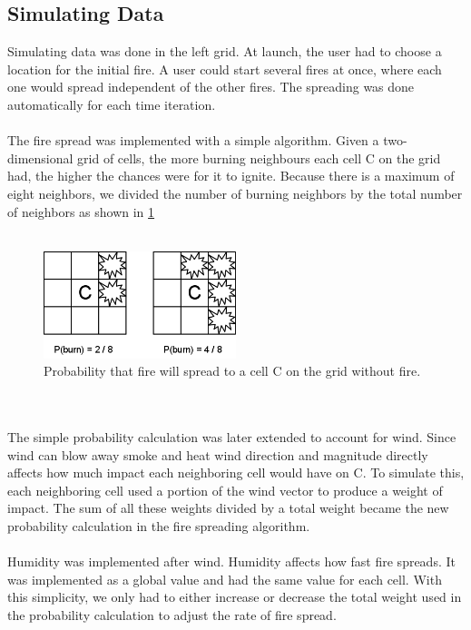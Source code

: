 \subsection{Simulating Data}
Simulating data was done in the left grid. At launch, the user had to choose a location for the initial fire. A user could start several fires at once, where each one would spread independent of the other fires. The spreading was done automatically for each time iteration.
\\\\
The fire spread was implemented with a simple algorithm. Given a two-dimensional grid of cells, the more burning neighbours each cell C on the grid had, the higher the chances were for it to ignite. Because there is a maximum of eight neighbors, we divided the number of burning neighbors by the total number of neighbors as shown in \ref{fig:fire-probability}
\\\\
\begin{figure}[here]
\centering
\includegraphics[width=0.5\textwidth]{solution/graphics/fire-probability.png}
\caption{Probability that fire will spread to a cell C on the grid without fire.}
\label{fig:fire-probability}
\end{figure}
\\\\
The simple probability calculation was later extended to account for wind. Since wind can blow away smoke and heat wind direction and magnitude directly affects how much impact each neighboring cell would have on C. To simulate this, each neighboring cell used a portion of the wind vector to produce a weight of impact. The sum of all these weights divided by a total weight became the new probability calculation in the fire spreading algorithm.
\\\\
Humidity was implemented after wind. Humidity affects how fast fire spreads. It was implemented as a global value and had the same value for each cell. With this simplicity, we only had to either increase or decrease the total weight used in the probability calculation to adjust the rate of fire spread.
